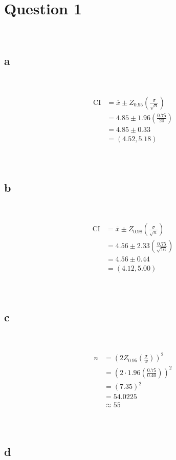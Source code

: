 \documentclass{article}
\begin{document}
\section*{Question 1}

~

\subsection*{a}

~

\begin{align*}
    \text{CI}&=\overline{x}\pm Z_{0.95}(\frac{\sigma}{\sqrt{n}})\\
    &=4.85\pm1.96(\frac{0.75}{20})\\
    &=4.85\pm0.33\\
    &=(4.52,5.18)\\
\end{align*}

~

\subsection*{b}

~

\begin{align*}
    \text{CI}&=\overline{x}\pm Z_{0.98}(\frac{\sigma}{\sqrt{n}})\\
    &=4.56\pm2.33(\frac{0.75}{\sqrt{16}})\\
    &=4.56\pm0.44\\
    &=(4.12,5.00)\\
\end{align*}

~

\subsection*{c}

~

\begin{align*}
    n&=(2Z_{0.95}(\frac{\sigma}{\mathit{w}}))^2\\
    &=(2\cdot1.96(\frac{0.75}{0.40}))^2\\
    &=(7.35)^2\\
    &=54.0225\\
    &\approx55\\
\end{align*}

~

\subsection*{d}
\end{document}
